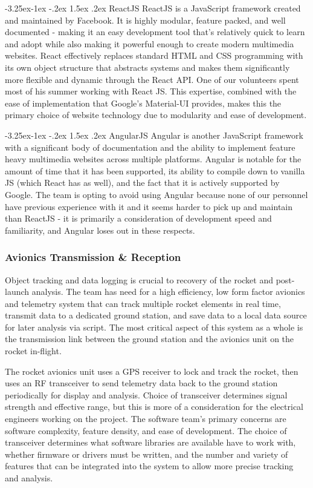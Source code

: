 \documentclass[onecolumn, draftclsnofoot, 10pt, compsoc]{IEEEtran}
\makeatletter
\renewcommand\paragraph{\@startsection{paragraph}{4}{\z@}%
                                     {-3.25ex\@plus -1ex \@minus -.2ex}%
                                     {1.5ex \@plus .2ex}%
                                     {\normalfont\normalsize\bfseries}}
\makeatother
\begin{document}
\paragraph{ReactJS}
ReactJS is a JavaScript framework created and maintained by Facebook. It is highly modular, feature packed, and well documented - making it an easy development tool that's relatively quick to learn and adopt while also making it powerful enough to create modern multimedia websites. React effectively replaces standard HTML and CSS programming with its own object structure that abstracts systems and makes them significantly more flexible and dynamic through the React API. One of our volunteers spent most of his summer working with React JS. This expertise, combined with the ease of implementation that Google's Material-UI provides, makes this the primary choice of website technology due to modularity and ease of development.

\paragraph{AngularJS}
Angular is another JavaScript framework with a significant body of documentation and the ability to implement feature heavy multimedia websites across multiple platforms. Angular is notable for the amount of time that it has been supported, its ability to compile down to vanilla JS (which React has as well), and the fact that it is actively supported by Google. The team is opting to avoid using Angular because none of our personnel have previous experience with it and it seems harder to pick up and maintain than ReactJS - it is primarily a consideration of development speed and familiarity, and Angular loses out in these respects.

\subsubsection{Avionics Transmission \& Reception}
Object tracking and data logging is crucial to recovery of the rocket and post-launch analysis. The team has need for a high efficiency, low form factor avionics and telemetry system that can track multiple rocket elements in real time, transmit data to a dedicated ground station, and save data to a local data source for later analysis via script. The most critical aspect of this system as a whole is the transmission link between the ground station and the avionics unit on the rocket in-flight.

The rocket avionics unit uses a GPS receiver to lock and track the rocket, then uses an RF transceiver to send telemetry data back to the ground station periodically for display and analysis. Choice of transceiver determines signal strength and effective range, but this is more of a consideration for the electrical engineers working on the project. The software team's primary concerns are software complexity, feature density, and ease of development. The choice of transceiver determines what software libraries are available have to work with, whether firmware or drivers must be written, and the number and variety of features that can be integrated into the system to allow more precise tracking and analysis.
\end{document}
